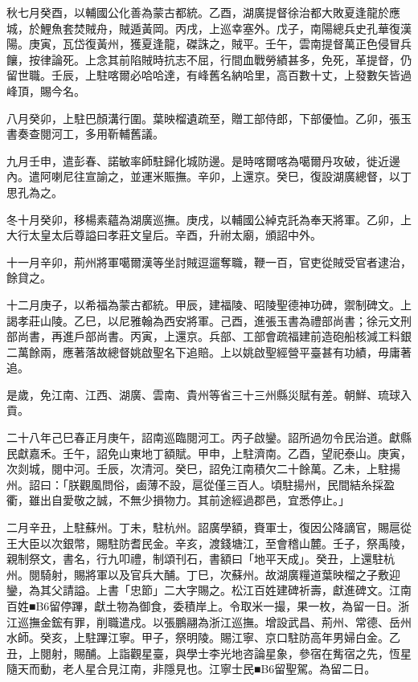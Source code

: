 \begin{pinyinscope}
秋七月癸酉，以輔國公化善為蒙古都統。乙酉，湖廣提督徐治都大敗夏逢龍於應城，於鯉魚套焚賊舟，賊遁黃岡。丙戌，上巡幸塞外。戊子，南陽總兵史孔華復漢陽。庚寅，瓦岱復黃州，獲夏逢龍，磔誅之，賊平。壬午，雲南提督萬正色侵冒兵饟，按律論死。上念其前陷賊時抗志不屈，行間血戰勞績甚多，免死，革提督，仍留世職。壬辰，上駐喀爾必哈哈達，有峰舊名納哈里，高百數十丈，上發數矢皆過峰頂，賜今名。

八月癸卯，上駐巴顏溝行圍。葉映榴遺疏至，贈工部侍郎，下部優恤。乙卯，張玉書奏查閱河工，多用靳輔舊議。

九月壬申，遣彭春、諾敏率師駐歸化城防邊。是時喀爾喀為噶爾丹攻破，徙近邊內。遣阿喇尼往宣諭之，並運米賑撫。辛卯，上還京。癸巳，復設湖廣總督，以丁思孔為之。

冬十月癸卯，移楊素蘊為湖廣巡撫。庚戌，以輔國公綽克託為奉天將軍。乙卯，上大行太皇太后尊謚曰孝莊文皇后。辛酉，升祔太廟，頒詔中外。

十一月辛卯，荊州將軍噶爾漢等坐討賊逗遛奪職，鞭一百，官吏從賊受官者逮治，餘貸之。

十二月庚子，以希福為蒙古都統。甲辰，建福陵、昭陵聖德神功碑，禦制碑文。上謁孝莊山陵。乙巳，以尼雅翰為西安將軍。己酉，進張玉書為禮部尚書；徐元文刑部尚書，再進戶部尚書。丙寅，上還京。兵部、工部會疏福建前造砲船核減工料銀二萬餘兩，應著落故總督姚啟聖名下追賠。上以姚啟聖經營平臺甚有功績，毋庸著追。

是歲，免江南、江西、湖廣、雲南、貴州等省三十三州縣災賦有差。朝鮮、琉球入貢。

二十八年己巳春正月庚午，詔南巡臨閱河工。丙子啟鑾。詔所過勿令民治道。獻縣民獻嘉禾。壬午，詔免山東地丁額賦。甲申，上駐濟南。乙酉，望祀泰山。庚寅，次剡城，閱中河。壬辰，次清河。癸巳，詔免江南積欠二十餘萬。乙未，上駐揚州。詔曰：「朕觀風問俗，鹵薄不設，扈從僅三百人。頃駐揚州，民間結糸採盈衢，雖出自愛敬之誠，不無少損物力。其前途經過郡邑，宜悉停止。」

二月辛丑，上駐蘇州。丁未，駐杭州。詔廣學額，賚軍士，復因公降謫官，賜扈從王大臣以次銀幣，賜駐防耆民金。辛亥，渡錢塘江，至會稽山麓。壬子，祭禹陵，親制祭文，書名，行九叩禮，制頌刊石，書額曰「地平天成」。癸丑，上還駐杭州。閱騎射，賜將軍以及官兵大酺。丁巳，次蘇州。故湖廣糧道葉映榴之子敷迎鑾，為其父請謚。上書「忠節」二大字賜之。松江百姓建碑祈壽，獻進碑文。江南百姓■B6留停蹕，獻土物為御食，委積岸上。令取米一撮，果一枚，為留一日。浙江巡撫金鋐有罪，削職遣戍。以張鵬翮為浙江巡撫。增設武昌、荊州、常德、岳州水師。癸亥，上駐蹕江寧。甲子，祭明陵。賜江寧、京口駐防高年男婦白金。乙丑，上閱射，賜酺。上詣觀星臺，與學士李光地咨論星象，參宿在觜宿之先，恆星隨天而動，老人星合見江南，非隱見也。江寧士民■B6留聖駕。為留二日。


\end{pinyinscope}
